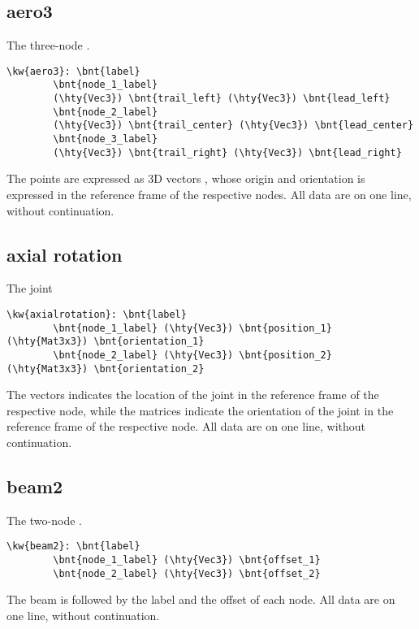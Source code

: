 \subsection{aero3}
The three-node .
\begin{Verbatim}[commandchars=\\\{\}]
    \kw{aero3}: \bnt{label}
        \bnt{node_1_label}
        (\hty{Vec3}) \bnt{trail_left} (\hty{Vec3}) \bnt{lead_left}
        \bnt{node_2_label}
        (\hty{Vec3}) \bnt{trail_center} (\hty{Vec3}) \bnt{lead_center}
        \bnt{node_3_label}
        (\hty{Vec3}) \bnt{trail_right} (\hty{Vec3}) \bnt{lead_right}
\end{Verbatim}
The points are expressed as 3D vectors , whose origin and orientation
is expressed in the reference frame of the respective nodes.
All data are on one line, without continuation.

\subsection{axial rotation}
The  joint
\begin{Verbatim}[commandchars=\\\{\}]
    \kw{axialrotation}: \bnt{label}
        \bnt{node_1_label} (\hty{Vec3}) \bnt{position_1} (\hty{Mat3x3}) \bnt{orientation_1}
        \bnt{node_2_label} (\hty{Vec3}) \bnt{position_2} (\hty{Mat3x3}) \bnt{orientation_2}
\end{Verbatim}
The  vectors indicates the location of the joint
in the reference frame of the respective node,
while the  matrices indicate the orientation of the joint
in the reference frame of the respective node.
All data are on one line, without continuation.

\subsection{beam2}
The two-node .
\begin{Verbatim}[commandchars=\\\{\}]
    \kw{beam2}: \bnt{label}
        \bnt{node_1_label} (\hty{Vec3}) \bnt{offset_1}
        \bnt{node_2_label} (\hty{Vec3}) \bnt{offset_2}
\end{Verbatim}
The beam  is followed by the label and the offset of each node.
All data are on one line, without continuation.

